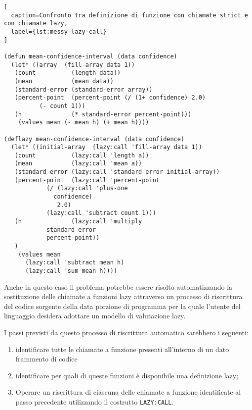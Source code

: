 \begin{lstlisting}[
  caption=Confronto tra definizione di funzione con chiamate strict e con chiamate lazy,
  label={lst:messy-lazy-call}
]

(defun mean-confidence-interval (data confidence)
  (let* ((array  (fill-array data 1))
   (count          (length data))
   (mean           (mean data))
   (standard-error (standard-error array))
   (percent-point  (percent-point (/ (1+ confidence) 2.0)
          (- count 1)))
   (h              (* standard-error percent-point)))
    (values mean (- mean h) (+ mean h))))

(deflazy mean-confidence-interval (data confidence)
  (let* ((initial-array  (lazy:call 'fill-array data 1))
   (count          (lazy:call 'length a))
   (mean           (lazy:call 'mean a))
   (standard-error (lazy:call 'standard-error initial-array))
   (percent-point  (lazy:call 'percent-point
            (/ (lazy:call 'plus-one
              confidence)
               2.0)
            (lazy:call 'subtract count 1)))
   (h              (lazy:call 'multiply
            standard-error
            percent-point))
   )
    (values mean
      (lazy:call 'subtract mean h)
      (lazy:call 'sum mean h))))

\end{lstlisting}

Anche in questo caso il problema potrebbe essere risolto automatizzando la
sostituzione delle chiamate a funzioni lazy attraverso un processo di
riscrittura del codice sorgente della data porzione di programma per la quale
l'utente del linguaggio desidera adottare un modello di valutazione lazy.

I passi previsti da questo processo di riscrittura automatico sarebbero i
seguenti:

\begin{enumerate}

\item identificare tutte le chiamate a funzione presenti all'interno di un dato
frammento di codice

\item identificare per quali di queste funzioni è disponibile una definizione
lazy;

\item Operare un riscrittura di ciascuna delle chiamate a funzione identificate
al passo precedente utilizzando il costrutto \texttt{LAZY:CALL}.

\end{enumerate}

